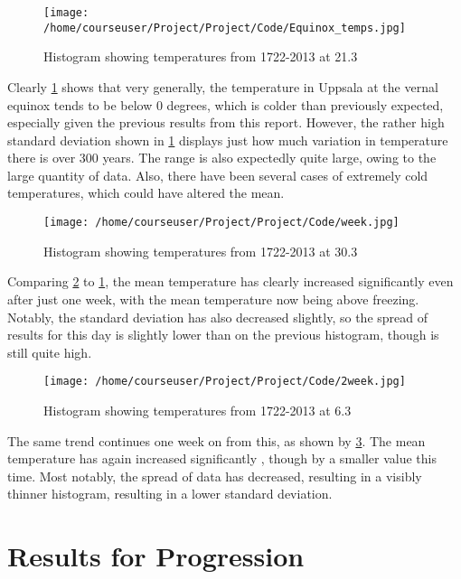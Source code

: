 \documentclass[a4paper,10pt,oneside]{article}
\begin{document}
\begin{figure}[!ht]
  \begin{center}
    \texttt{[image: /home/courseuser/Project/Project/Code/Equinox\_temps.jpg]}
    \caption{Histogram showing temperatures from 1722-2013 at 21.3}
    \label{fig:vern}
  \end{center}
\end{figure}

Clearly \ref{fig:vern} shows that very generally, the temperature in Uppsala at the
vernal equinox tends to be below 0 degrees, which is colder than previously expected, especially given the previous
results from this report. However, the rather high standard deviation
shown in \ref{fig:vern} displays just how much variation in temperature there is over 300 years.
The range is also expectedly quite large, owing to the large quantity of data. Also, there have been several cases of extremely
cold temperatures, which could have altered the mean.

\begin{figure}[!ht]
 \texttt{[image: /home/courseuser/Project/Project/Code/week.jpg]}
 \caption{Histogram showing temperatures from 1722-2013 at 30.3}
 \label{fig:week}
\end{figure}

Comparing \ref{fig:week} to \ref{fig:vern}, the mean temperature has clearly increased significantly even
after just one week, with the mean temperature now being above freezing. Notably, the standard deviation
has also decreased slightly, so the spread of results for this day is slightly lower than on the previous histogram, though is
still quite high.

\begin{figure}[!ht]
 \texttt{[image: /home/courseuser/Project/Project/Code/2week.jpg]}
 \caption{Histogram showing temperatures from 1722-2013 at 6.3}
 \label{fig:twoweek}
\end{figure}

The same trend continues one week on from this, as shown by \ref{fig:twoweek}. The mean temperature has again increased significantly
, though by a smaller value this time. Most notably, the spread of data has decreased, resulting in a visibly thinner histogram, resulting
in a lower standard deviation.

\section{Results for Progression}
\label{sec:prog}
\end{document}
